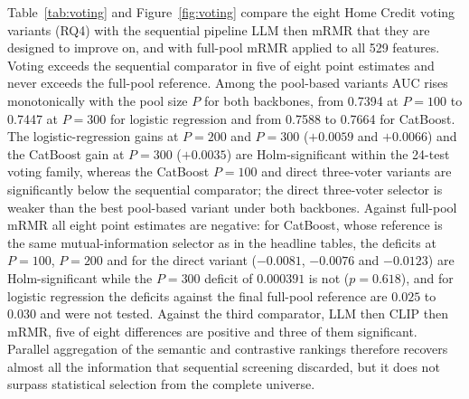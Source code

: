 \documentclass[final,5p,twocolumn]{elsarticle}
\begin{document}
Table~\ref{tab:voting} and Figure~\ref{fig:voting} compare the eight Home Credit voting variants (RQ4) with the sequential pipeline LLM then mRMR that they are designed to improve on, and with full-pool mRMR applied to all 529 features. Voting exceeds the sequential comparator in five of eight point estimates and never exceeds the full-pool reference. Among the pool-based variants AUC rises monotonically with the pool size $P$ for both backbones, from 0.7394 at $P=100$ to 0.7447 at $P=300$ for logistic regression and from 0.7588 to 0.7664 for CatBoost. The logistic-regression gains at $P=200$ and $P=300$ ($+0.0059$ and $+0.0066$) and the CatBoost gain at $P=300$ ($+0.0035$) are Holm-significant within the 24-test voting family, whereas the CatBoost $P=100$ and direct three-voter variants are significantly below the sequential comparator; the direct three-voter selector is weaker than the best pool-based variant under both backbones. Against full-pool mRMR all eight point estimates are negative: for CatBoost, whose reference is the same mutual-information selector as in the headline tables, the deficits at $P=100$, $P=200$ and for the direct variant ($-0.0081$, $-0.0076$ and $-0.0123$) are Holm-significant while the $P=300$ deficit of $0.000391$ is not ($p=0.618$), and for logistic regression the deficits against the final full-pool reference are $0.025$ to $0.030$ and were not tested. Against the third comparator, LLM then CLIP then mRMR, five of eight differences are positive and three of them significant. Parallel aggregation of the semantic and contrastive rankings therefore recovers almost all the information that sequential screening discarded, but it does not surpass statistical selection from the complete universe.
\end{document}
